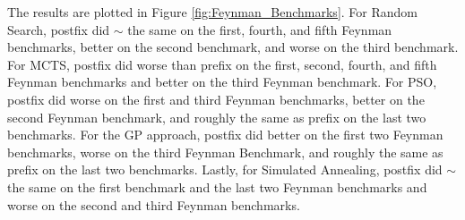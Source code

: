 \documentclass[runningheads]{llncs}
\begin{document}
\par The results are plotted in Figure \ref{fig:Feynman_Benchmarks}. For Random Search, postfix did $\sim$ the same on the first, fourth, and fifth Feynman benchmarks, better on the second benchmark, and worse on the third benchmark. For MCTS, postfix did worse than prefix on the first, second, fourth, and fifth Feynman benchmarks and better on the third Feynman benchmark. For PSO, postfix did worse on the first and third Feynman benchmarks, better on the second Feynman benchmark, and roughly the same as prefix on the last two benchmarks. For the GP approach, postfix did better on the first two Feynman benchmarks, worse on the third Feynman Benchmark, and roughly the same as prefix on the last two benchmarks. Lastly, for Simulated Annealing, postfix did $\sim$ the same on the first benchmark and the last two Feynman benchmarks and worse on the second and third Feynman benchmarks.
\end{document}
